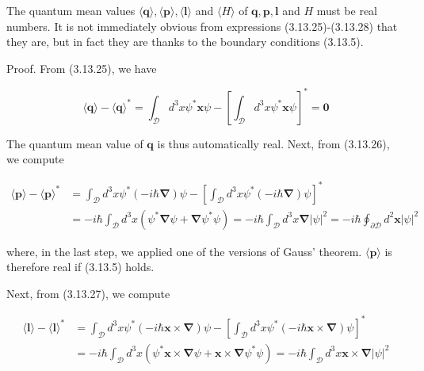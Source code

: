 \documentclass{article}
\begin{document}
The quantum mean values $\langle\boldsymbol{q}\rangle,\langle\boldsymbol{p}\rangle,\langle\boldsymbol{l}\rangle$ and $\langle H\rangle$ of $\boldsymbol{q}, \boldsymbol{p}, \boldsymbol{l}$ and $H$ must be real numbers. It is not immediately obvious from expressions (3.13.25)-(3.13.28) that they are, but in fact they are thanks to the boundary conditions (3.13.5).

Proof. From (3.13.25), we have
 
\begin{equation*}
\langle\boldsymbol{q}\rangle-\langle\boldsymbol{q}\rangle^{*}=\int_{\mathcal{D}} d^{3} x \psi^{*} \boldsymbol{x} \psi-\left[\int_{\mathcal{D}} d^{3} x \psi^{*} \boldsymbol{x} \psi\right]^{*}=\mathbf{0} \tag{3.13.29}
\end{equation*}
 

The quantum mean value of $\boldsymbol{q}$ is thus automatically real.
Next, from (3.13.26), we compute
 
\begin{align*}
\langle\boldsymbol{p}\rangle-\langle\boldsymbol{p}\rangle^{*} & =\int_{\mathcal{D}} d^{3} x \psi^{*}(-i \hbar \boldsymbol{\nabla}) \psi-\left[\int_{\mathcal{D}} d^{3} x \psi^{*}(-i \hbar \boldsymbol{\nabla}) \psi\right]^{*}  \tag{3.13.30}\\
& =-i \hbar \int_{\mathcal{D}} d^{3} x\left(\psi^{*} \boldsymbol{\nabla} \psi+\boldsymbol{\nabla} \psi^{*} \psi\right)=-i \hbar \int_{\mathcal{D}} d^{3} x \boldsymbol{\nabla}|\psi|^{2}=-i \hbar \oint_{\partial \mathcal{D}} d^{2} \boldsymbol{x}|\psi|^{2}
\end{align*}
 
where, in the last step, we applied one of the versions of Gauss' theorem. $\langle\boldsymbol{p}\rangle$ is therefore real if (3.13.5) holds.

Next, from (3.13.27), we compute
 
\begin{align*}
\langle\boldsymbol{l}\rangle-\langle\boldsymbol{l}\rangle^{*} & =\int_{\mathcal{D}} d^{3} x \psi^{*}(-i \hbar \boldsymbol{x} \times \boldsymbol{\nabla}) \psi-\left[\int_{\mathcal{D}} d^{3} x \psi^{*}(-i \hbar \boldsymbol{x} \times \boldsymbol{\nabla}) \psi\right]^{*}  \tag{3.13.31}\\
& =-i \hbar \int_{\mathcal{D}} d^{3} x\left(\psi^{*} \boldsymbol{x} \times \boldsymbol{\nabla} \psi+\boldsymbol{x} \times \boldsymbol{\nabla} \psi^{*} \psi\right)=-i \hbar \int_{\mathcal{D}} d^{3} x \boldsymbol{x} \times \boldsymbol{\nabla}|\psi|^{2}
\end{align*}
 
\end{document}
